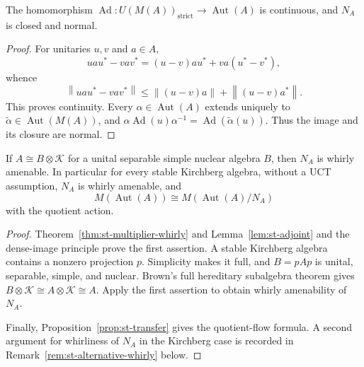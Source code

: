 \begin{lemma}\label{lem:st-adjoint}
 The homomorphism $\operatorname{Ad}:U(M(A))_{\mathrm{strict}}\to\operatorname{Aut}(A)
$ is continuous, and $N_A$ is closed and normal.
\end{lemma}

\begin{proof}
For unitaries $u,v$ and $a\in A$, 
\begin{equation*}
uau^*-vav^*=(u-v)au^*+va(u^*-v^*), 
\end{equation*}
whence 
\begin{equation*}
\left\|uau^*-vav^*\right\| 
\leq\left\|(u-v)a\right\|+\left\|(u-v)a^*\right\|. 
\end{equation*}
This proves continuity. Every $\alpha\in\operatorname{Aut}(A)$ extends uniquely to $\widetilde\alpha\in\operatorname{Aut}(M(A))$, and $\alpha\operatorname{Ad}(u)\alpha^{-1}=\operatorname{Ad} (\widetilde\alpha(u))$. Thus the image and its closure are normal.
\end{proof}

\begin{theorem}\label{thm:st-kernel-ea}
 If $A\cong B\otimes\mathcal{K}$ for a unital separable
simple nuclear algebra $B$, then $N_A$ is whirly amenable. In particular
for every stable Kirchberg algebra, without a UCT assumption, $N_A$ is
whirly amenable, and
\begin{equation}  \label{eq:st-general-quotient}
M(\operatorname{Aut}(A))\cong M(\operatorname{Aut}(A)/N_A)
\end{equation}
with the quotient action.
\end{theorem}

\begin{proof}
Theorem~\ref{thm:st-multiplier-whirly} and Lemma~\ref{lem:st-adjoint} and the dense-image principle prove
the first assertion. A stable Kirchberg algebra contains a nonzero
projection $p$. Simplicity makes it full, and $B=pAp$ is unital, separable,
simple, and nuclear. Brown's full hereditary subalgebra theorem \cite[Theorem~2.8]{Brown1977}
gives $B\otimes\mathcal{K}\cong A\otimes\mathcal{K}\cong A$. Apply the first
assertion to obtain whirly amenability of $N_A$.

Finally,
Proposition~\ref{prop:st-transfer} gives the quotient-flow formula. A second
argument for whirliness of $N_A$ in the Kirchberg case is recorded
in Remark~\ref{rem:st-alternative-whirly} below.
\end{proof}

